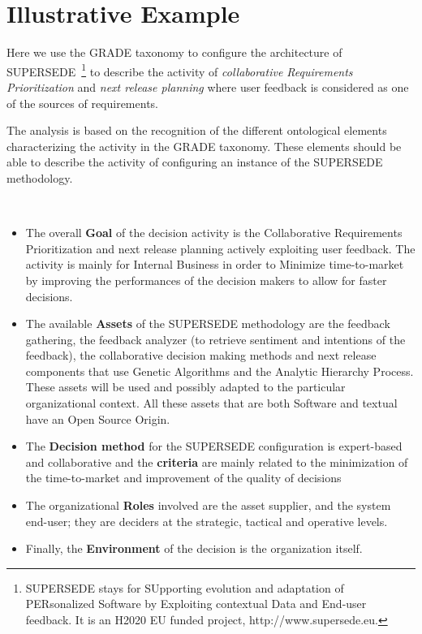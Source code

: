 \section{Illustrative Example}
\label{sec-example}

Here we use the GRADE taxonomy to configure the architecture of SUPERSEDE~\footnote{SUPERSEDE stays for SUpporting evolution and adaptation of PERsonalized Software by Exploiting
contextual Data and End-user feedback. It is an H2020 EU funded project,
http://www.supersede.eu.} to describe the activity of \textit{collaborative Requirements Prioritization} and \textit{next release planning} where user feedback is considered as one of the sources of requirements.

The analysis is based on the recognition of the different ontological elements characterizing the activity in the GRADE taxonomy. These elements should be able to describe the activity of configuring an instance of the SUPERSEDE methodology. 

~\cite{FranchRPAAGNOSS18,BusettaKMPSS17,KifetewMPSSB17_RE17demo,ameller2017replan} 
\begin{itemize}
    \item The overall \textsf{\textbf{Goal}} of the decision activity is the Collaborative Requirements Prioritization and next release planning actively exploiting user feedback. The activity is mainly for \textsf{Internal Business} in order to \textsf{Minimize time-to-market} by improving the performances of the decision makers to allow for faster decisions.
    \item The available \textsf{\textbf{Assets}} of the SUPERSEDE methodology are the feedback gathering, the feedback analyzer (to retrieve sentiment and intentions of the feedback), the collaborative decision making methods and next release components that use Genetic Algorithms and the Analytic Hierarchy Process. These assets will be \textsf{used} and possibly \textsf{adapted} to the particular organizational context. All these assets that are both \textsf{Software} and textual have an \textsf{Open Source} \textsf{Origin}. 
    \item The \textsf{\textbf{Decision method}} for the SUPERSEDE configuration is \textsf{expert-based} and collaborative and the \textsf{\textbf{criteria}} are mainly related to the minimization of the \textsf{time-to-market} and improvement of the quality of decisions
    \item The organizational \textsf{\textbf{Roles}} involved are the \textsf{asset supplier}, and the \textsf{system end-user}; they are \textsf{deciders} at the strategic, tactical and operative levels. 
    \item Finally, the \textsf{\textbf{Environment}} of the decision is the \textsf{organization} itself.
\end{itemize}

